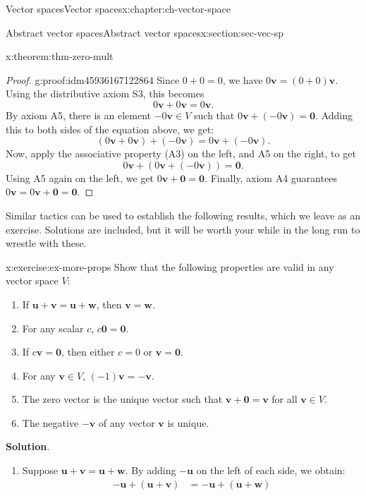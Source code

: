 \documentclass[oneside,10pt,]{book}
\newcommand{\blocktitlefont}{\relax}
\numberwithin{equation}{section}
\newcommand{\uu}{\mathbf{u}}
\newcommand{\vv}{\mathbf{v}}
\newcommand{\ww}{\mathbf{w}}
\newcommand{\zer}{\mathbf{0}}
\newcommand{\amp}{&}
\begin{document}
\begin{chapterptx}{Vector spaces}{}{Vector spaces}{}{}{x:chapter:ch-vector-space}
\begin{sectionptx}{Abstract vector spaces}{}{Abstract vector spaces}{}{}{x:section:sec-vec-sp}
\begin{theorem}{}{}{x:theorem:thm-zero-mult}
\end{theorem}
\begin{proof}{}{g:proof:idm45936167122864}
Since \(0+0=0\), we have \(0\vv=(0+0)\vv\). Using the distributive axiom S3, this becomes%
\begin{equation*}
0\vv + 0\vv = 0\vv\text{.}
\end{equation*}
By axiom A5, there is an element \(-0\vv\in V\) such that \(0\vv+(-0\vv)=\zer\). Adding this to both sides of the equation above, we get:%
\begin{equation*}
(0\vv+0\vv)+(-0\vv) = 0\vv+(-0\vv)\text{.}
\end{equation*}
Now, apply the associative property (A3) on the left, and A5 on the right, to get%
\begin{equation*}
0\vv + (0\vv+(-0\vv)) = \zer\text{.}
\end{equation*}
Using A5 again on the left, we get \(0\vv+\zer = \zer\). Finally, axiom A4 guarantees \(0\vv = 0\vv+\zer = \zer\).%
\end{proof}
Similar tactics can be used to establish the following results, which we leave as an exercise. Solutions are included, but it will be worth your while in the long run to wrestle with these.%
\begin{inlineexercise}{}{x:exercise:ex-more-props}%
Show that the following properties are valid in any vector space \(V\):%
\begin{enumerate}
\item{}If \(\uu+\vv=\uu+\ww\), then \(\vv=\ww\).%
\item{}For any scalar \(c\), \(c\zer=\zer\).%
\item{}If \(c\vv=\zer\), then either \(c=0\) or \(\vv=\zer\).%
\item{}For any \(\vv\in V\), \((-1)\vv=-\vv\).%
\item{}The zero vector is the unique vector such that \(\vv+\zer=\vv\) for all \(\vv\in V\).%
\item{}The negative \(-\vv\) of any vector \(\vv\) is unique.%
\end{enumerate}
%
\par\smallskip%
\noindent\textbf{\blocktitlefont Solution}.\label{g:solution:idm45936167105232}{}\hypertarget{g:solution:idm45936167105232}{}\quad{}%
\begin{enumerate}
\item{}Suppose \(\uu+\vv=\uu+\ww\). By adding \(-\uu\) on the left of each side, we obtain:%
\begin{align*}
-\uu+(\uu+\vv) \amp =-\uu+(\uu+\ww)\\

\end{align*}
\end{enumerate}
\end{inlineexercise}
\end{sectionptx}
\end{chapterptx}
\end{document}
